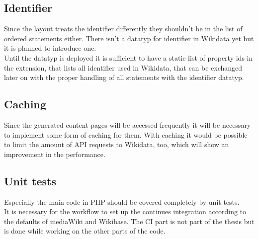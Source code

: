 \documentclass[11pt]{article}
\begin{document}
\subsection {Identifier}
Since the layout treats the identifier differently they shouldn't be in the list of ordered statements either. There isn't a datatyp for identifier in Wikidata yet but it is planned to introduce one. \\
Until the datatyp is deployed it is sufficient to have a static list of property ids in the extension, that lists all identifier used in Wikidata, that can be exchanged later on with the proper handling of all statements with the identifier datatyp.

\subsection{Caching}
Since the generated content pages will be accessed frequently it will be necessary to implement some form of caching for them. With caching it would be possible to limit the amount of API requests to Wikidata, too, which will show an improvement in the performance. 

\subsection {Unit tests}
Especially the main code in PHP should be covered completely by unit tests.\\
It is necessary for the workflow to set up the continues integration according to the defaults of mediaWiki and Wikibase. The CI part is not part of the thesis but is done while working on the other parts of the code.
\end{document}
